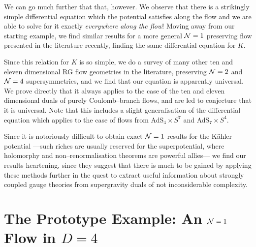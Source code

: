\documentclass[a4paper,12pt]{article}
\begin{document}
We can go much further that that, however. We observe that there is a
strikingly simple differential equation which the potential satisfies
along the flow and we are able to solve for it exactly {\it everywhere
  along the flow}!  Moving away from our starting example, we find
similar results for a more general ${\cal N}=1$ preserving flow
presented in the literature recently\cite{warnernew}, finding the same
differential equation for $K$.

Since this relation for $K$ is so simple, we do a survey of many other
ten and eleven dimensional RG flow geometries in the
literature\cite{pw1,bs2,newwarner}, preserving ${\cal N}=2$ and ${\cal
  N}=4$ supersymmetries, and we find that our equation is apparently
universal. We prove directly that it always applies to the case of the
ten and eleven dimensional duals of purely Coulomb--branch
flows\cite{freed2,bakas,bakas2}, and are led to conjecture that it is
universal.  Note that this includes a slight generalisation of the
differential equation which applies to the case of flows from
AdS$_4\times S^7$ and AdS$_7\times S^4$.

Since it is notoriously difficult to obtain exact ${\cal N}=1$ results
for the K\"ahler potential ---such riches are usually reserved for the
superpotential, where holomorphy and non--renormalisation theorems are
powerful allies--- we find our results heartening, since they suggest
that there is much to be gained by applying these methods further in
the quest to extract useful information about strongly coupled gauge
theories from supergravity duals of not inconsiderable complexity.



\section{The Prototype Example: An ${\cal N}=1$  Flow in $D=4$  }
\end{document}
